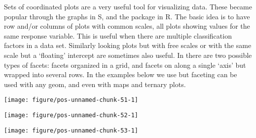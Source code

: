 \documentclass[paper=a4,10pt,div=17,headsepline,BCOR=12mm,twoside,open=right]{scrbook}\usepackage{knitr}
\begin{document}
Sets of coordinated plots are a very useful tool for visualizing data. These became popular through the  graphs in S, and the  package in R. The basic idea is to have row and/or columns of plots with common scales, all plots showing values for the same response variable. This is useful when there are multiple classification factors in a data set. Similarly looking plots but with free scales or with the same scale but a `floating' intercept are sometimes also useful. In \ggplot there are two possible types of facets: facets organized in a grid, and facets on along a single `axis' but wrapped into several rows. In the examples below we use  but faceting can be used with any geom, and even with maps and ternary plots.

\begin{knitrout}\footnotesize
{}\color{fgcolor}\begin{kframe}
\begin{alltt}
 \hlkwb{<-}   \hlopt{+} \hlstd{()}
 \hlopt{+}  \hlopt{~} 
\end{alltt}
\end{kframe}

{\centering \texttt{[image: figure/pos-unnamed-chunk-51-1]} 

}



\end{knitrout}

\begin{knitrout}\footnotesize
{}\color{fgcolor}\begin{kframe}
\begin{alltt}
 \hlopt{+}  \hlopt{~} 
\end{alltt}
\end{kframe}

{\centering \texttt{[image: figure/pos-unnamed-chunk-52-1]} 

}



\end{knitrout}

\begin{knitrout}\footnotesize
{}\color{fgcolor}\begin{kframe}
\begin{alltt}
 \hlopt{+}  \hlopt{~}   \hlstd{=} \hlstd{)}
\end{alltt}
\end{kframe}

{\centering \texttt{[image: figure/pos-unnamed-chunk-53-1]} 

}



\end{knitrout}
\end{document}
